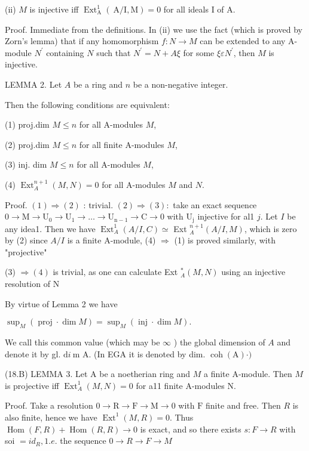 (ii) $M$ is injective iff $\operatorname{Ext}_{\mathrm{A}}^{1}(\mathrm{~A} / \mathrm{I}, \mathrm{M})=0$ for all ideals I of A.

Proof. Immediate from the definitions. In (ii) we use the fact (which is proved by Zorn's lemma) that if any homomorphism $f: N \rightarrow M$ can be extended to any A-module $N^{\prime}$ containing $N$ such that $N^{\prime}=N+A \xi$ for some $\xi \varepsilon N^{\prime}$, then $M$ is injective.

LEMMA 2. Let $A$ be a ring and $n$ be a non-negative integer.

Then the following conditions are equivalent:

(1) proj.dim $M \leqslant n$ for all A-modules $M$,

(2) proj.dim $M \leqslant n$ for all finite A-modules $M$,

(3) inj. dim $M \leqslant n$ for all A-modules $M$,

(4) $\operatorname{Ext}_{A}^{n+1}(M, N)=0$ for all A-modules $M$ and $N$.

Proof. $(1) \Rightarrow(2)$ : trivial. $(2) \Rightarrow(3):$ take an exact sequence $0 \rightarrow \mathrm{M} \rightarrow \mathrm{U}_{0} \rightarrow \mathrm{U}_{1} \rightarrow \ldots \rightarrow \mathrm{U}_{\mathrm{n}-1} \rightarrow \mathrm{C} \rightarrow 0$ with $\mathrm{U}_{\mathrm{j}}$ injective for al1 $j$. Let $I$ be any idea1. Then we have $\operatorname{Ext}_{A}^{1}(A / I, C) \simeq$ Ext $_{A}^{n+1}(A / I, M)$, which is zero by (2) since $A / I$ is a finite A-module, (4) $\Rightarrow$ (1) is proved similarly, with "projective"

(3) $\Rightarrow(4)$ is trivial, as one can calculate Ext ${ }_{A}^{*}(M, N)$ using an injective resolution of $\mathrm{N}$

By virtue of Lemma 2 we have

$\sup _{M}(\operatorname{proj} \cdot \operatorname{dim} M)=\sup _{M}(\operatorname{inj} \cdot \operatorname{dim} M) .$

We call this common value (which may be $\infty$ ) the global dimension of $A$ and denote it by gl. $\mathrm{d} i \mathrm{~m}$ A. (In EGA it is denoted by dim. $\operatorname{coh}(\mathrm{A}) \cdot)$

(18.B) LEMMA 3. Let A be a noetherian ring and $M$ a finite A-module. Then $M$ is projective iff $\operatorname{Ext}_{A}^{1}(M, N)=0$ for a11 finite A-modules $\mathrm{N}$.

Proof. Take a resolution $0 \rightarrow \mathrm{R} \rightarrow \mathrm{F} \rightarrow \mathrm{M} \rightarrow 0$ with $\mathrm{F}$ finite and free. Then $R$ is also finite, hence we have $\operatorname{Ext}^{1}(M, R)=0$. Thus $\operatorname{Hom}(F, R)+\operatorname{Hom}(R, R) \rightarrow 0$ is exact, and so there exists $s: F \rightarrow R$ with soi $=i d_{R}, 1 . e$. the sequence $0 \rightarrow R \rightarrow F \rightarrow M$

